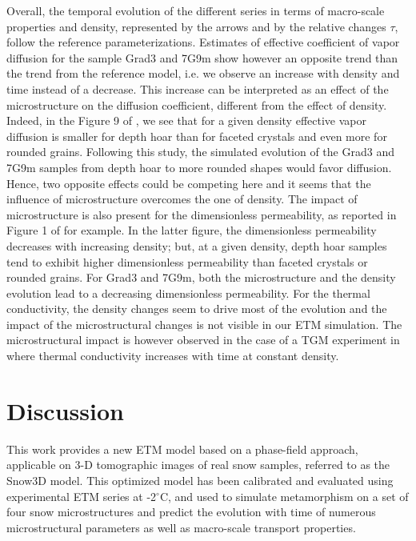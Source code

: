 \documentclass[draft,ms]{agujournal2019}
\begin{document}
Overall, the temporal evolution of the different series in terms of macro-scale properties and density, represented by the arrows and by the relative changes $\tau$, follow the reference parameterizations. Estimates of effective coefficient of vapor diffusion for the sample Grad3 and 7G9m show however an opposite trend than the trend from the reference model, i.e. we observe an increase with density and time instead of a decrease. This increase can be interpreted as an effect of the microstructure on the diffusion coefficient, different from the effect of density. Indeed, in the Figure 9 of , we see that for a given density effective vapor diffusion is smaller for depth hoar than for faceted crystals and even more for rounded grains. Following this study, the simulated evolution of the Grad3 and 7G9m samples from depth hoar to more rounded shapes would favor diffusion. Hence, two opposite effects could be competing here and it seems that the influence of microstructure overcomes the one of density. The impact of microstructure is also present for the dimensionless permeability, as reported in Figure 1 of  for example. In the latter figure, the dimensionless permeability decreases with increasing density; but, at a given density, depth hoar samples tend to exhibit higher dimensionless permeability than faceted crystals or rounded grains. For Grad3 and 7G9m, both the microstructure and the density evolution lead to a decreasing dimensionless permeability. For the thermal conductivity, the density changes seem to drive most of the evolution and the impact of the microstructural changes is not visible in our ETM simulation. The microstructural impact is however observed in the case of a TGM experiment in  where thermal conductivity increases with time at constant density.  


\section{Discussion}
\label{sec:disc}

This work provides a new ETM model based on a phase-field approach, applicable on 3-D tomographic images of real snow samples, referred to as the Snow3D model. This optimized model has been calibrated and evaluated using experimental ETM series at -2$^\circ$C, and used to simulate metamorphism on a set of four snow microstructures and predict the evolution with time of numerous microstructural parameters as well as macro-scale transport properties.
\end{document}
